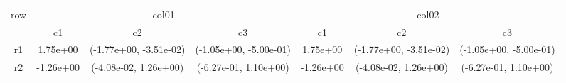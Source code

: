 \begin{tabular}{ccccccc}
\toprule
\multirow{2}{*}{row}&\multicolumn{3}{c}{col01}&\multicolumn{3}{c}{col02}\tabularnewline
\cmidrule(lr){2-4}
\cmidrule(lr){5-7}
&c1&c2&c3&c1&c2&c3\tabularnewline
\midrule
r1&1.75e+00& (-1.77e+00, -3.51e-02)& (-1.05e+00, -5.00e-01)&1.75e+00& (-1.77e+00, -3.51e-02)& (-1.05e+00, -5.00e-01)\tabularnewline
r2&-1.26e+00& (-4.08e-02, 1.26e+00)& (-6.27e-01, 1.10e+00)&-1.26e+00& (-4.08e-02, 1.26e+00)& (-6.27e-01, 1.10e+00)\tabularnewline
\bottomrule
\end{tabular}

